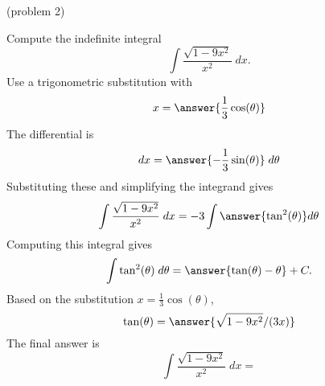 \documentclass{ximera}
\begin{document}
\begin{problem}(problem 2)

Compute the indefinite integral
\[
\int \frac{\sqrt{1-9x^2}}{x^2} \; dx.
\]
Use a trigonometric substitution with\\
\[
x = \answer{\frac13\cos(\theta)}
\]
The differential is\\
\[
dx = \answer{-\frac13\sin(\theta)} \; d\theta
\]
Substituting these and simplifying the integrand gives\\
\[
\int \frac{\sqrt{1-9x^2}}{x^2} \; dx = -3\int \answer{\tan^2(\theta)} d\theta
\]
Computing this integral gives
\[
\int \tan^2(\theta) \; d\theta = \answer{\tan(\theta) - \theta} + C.
\]
Based on the substitution $x = \frac13 \cos(\theta)$, \\
\[
\tan(\theta) = \answer{\sqrt{1-9x^2}/(3x)}
\]
The final answer is
\[
\int  \frac{\sqrt{1-9x^2}}{x^2} \; dx = 
\]
\begin{center}
\begin{multipleChoice}
\end{multipleChoice}
\end{center}





\end{problem}
\end{document}
